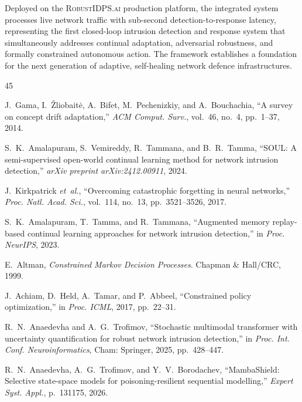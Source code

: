 \documentclass[journal]{IEEEtran}
\theoremstyle{definition}
\theoremstyle{remark}
\newcommand{\RobustIDPS}{\textsc{RobustIDPS.ai}}
\begin{document}
Deployed on the \RobustIDPS{} production platform, the integrated system processes live network traffic with sub-second detection-to-response latency, representing the first closed-loop intrusion detection and response system that simultaneously addresses continual adaptation, adversarial robustness, and formally constrained autonomous action. The framework establishes a foundation for the next generation of adaptive, self-healing network defence infrastructures.



\begin{thebibliography}{45}

J.~Gama, I.~\v{Z}liobait\.{e}, A.~Bifet, M.~Pechenizkiy, and A.~Bouchachia,
``A survey on concept drift adaptation,''
\emph{ACM Comput. Surv.}, vol.~46, no.~4, pp.~1--37, 2014.

S.~K.~Amalapuram, S.~Vemireddy, R.~Tammana, and B.~R.~Tamma,
``{SOUL}: A semi-supervised open-world continual learning method for network intrusion detection,''
\emph{arXiv preprint arXiv:2412.00911}, 2024.

J.~Kirkpatrick \textit{et~al.},
``Overcoming catastrophic forgetting in neural networks,''
\emph{Proc. Natl. Acad. Sci.}, vol.~114, no.~13, pp.~3521--3526, 2017.

S.~K.~Amalapuram, T.~Tamma, and R.~Tammana,
``Augmented memory replay-based continual learning approaches for network intrusion detection,''
in \emph{Proc. NeurIPS}, 2023.

E.~Altman,
\emph{Constrained Markov Decision Processes}.
Chapman \& Hall/CRC, 1999.

J.~Achiam, D.~Held, A.~Tamar, and P.~Abbeel,
``Constrained policy optimization,''
in \emph{Proc. ICML}, 2017, pp.~22--31.

R.~N.~Anaedevha and A.~G.~Trofimov,
``Stochastic multimodal transformer with uncertainty quantification for robust network intrusion detection,''
in \emph{Proc. Int. Conf. Neuroinformatics}, Cham: Springer, 2025, pp.~428--447.

R.~N.~Anaedevha, A.~G.~Trofimov, and Y.~V.~Borodachev,
``{MambaShield}: Selective state-space models for poisoning-resilient sequential modelling,''
\emph{Expert Syst. Appl.}, p.~131175, 2026.


\end{thebibliography}
\end{document}
